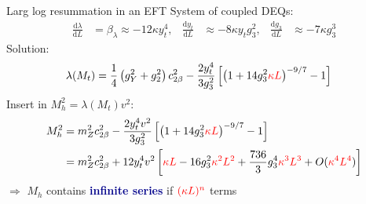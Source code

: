 \documentclass[hyperref={pdfpagelabels=false},ngerman]{beamer}
\newcommand{\MS}{\ensuremath{M_S}}
\renewcommand{\emph}[1]{\textbf{\textcolor{darkblue}{#1}}}
\newcommand{\dd}{\text{d}}
\begin{document}
\begin{frame}{Larg log resummation in an EFT}
  System of coupled DEQs:
  \begin{align*}
    \frac{\dd\lambda}{\dd L} &= \beta_\lambda \approx -12 \kappa y_t^4 , &
    \frac{\dd y_t}{\dd L} &\approx -8 \kappa y_t g_3^2 , &
    \frac{\dd g_3}{\dd L} &\approx -7 \kappa g_3^3
  \end{align*}
  Solution:
  \begin{align*}
    \lambda(M_t) &= \frac{1}{4}\left(g_Y^{2} + g_2^2\right) c^2_{2\beta} %
                   - \frac{2 y_t^4}{3 g_3^2} \left[
                   \left( 1 + 14 g_3^2 \textcolor{red}{\kappa L} \right)^{-9/7} - 1
    \right]
  \end{align*}
  Insert in $M_h^2 = \lambda(M_t) v^2$:
  \begin{align*}
    M_h^2 &= m_Z^2 c^2_{2\beta}
            - \frac{2 y_t^4 v^2}{3 g_3^2} \left[
            \left( 1 + 14 g_3^2 \textcolor{red}{\kappa L} \right)^{-9/7} - 1
            \right]\\
          &= m_Z^2 c^2_{2\beta}
            + 12 y_t^4 v^2 \left[
            \textcolor{red}{\kappa L}
            - 16 g_3^2 \textcolor{red}{\kappa^2 L^2}
            + \frac{736}{3} g_3^4 \textcolor{red}{\kappa^3 L^3} + O(\textcolor{red}{\kappa^4L^4})
            \right]
  \end{align*}
  $\Rightarrow$ $M_h$ contains \emph{infinite series} if $\textcolor{red}{(\kappa L)^n}$ terms
\end{frame}
\end{document}
